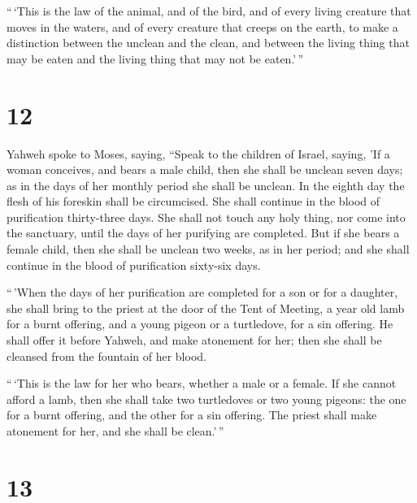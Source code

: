  ``\,`This is the law of the animal, and of the bird, and
of every living creature that moves in the waters, and of every creature
that creeps on the earth,  to make a distinction between
the unclean and the clean, and between the living thing that may be
eaten and the living thing that may not be eaten.'\,''

\hypertarget{section-11}{%
\section{12}\label{section-11}}

 Yahweh spoke to Moses, saying,  ``Speak to
the children of Israel, saying, 'If a woman conceives, and bears a male
child, then she shall be unclean seven days; as in the days of her
monthly period she shall be unclean.  In the eighth day
the flesh of his foreskin shall be circumcised.  She shall
continue in the blood of purification thirty-three days. She shall not
touch any holy thing, nor come into the sanctuary, until the days of her
purifying are completed.  But if she bears a female child,
then she shall be unclean two weeks, as in her period; and she shall
continue in the blood of purification sixty-six days.

 ``\,'When the days of her purification are completed for
a son or for a daughter, she shall bring to the priest at the door of
the Tent of Meeting, a year old lamb for a burnt offering, and a young
pigeon or a turtledove, for a sin offering.  He shall
offer it before Yahweh, and make atonement for her; then she shall be
cleansed from the fountain of her blood.

``\,`This is the law for her who bears, whether a male or a female.
 If she cannot afford a lamb, then she shall take two
turtledoves or two young pigeons: the one for a burnt offering, and the
other for a sin offering. The priest shall make atonement for her, and
she shall be clean.'\,''

\hypertarget{section-12}{%
\section{13}\label{section-12}}

